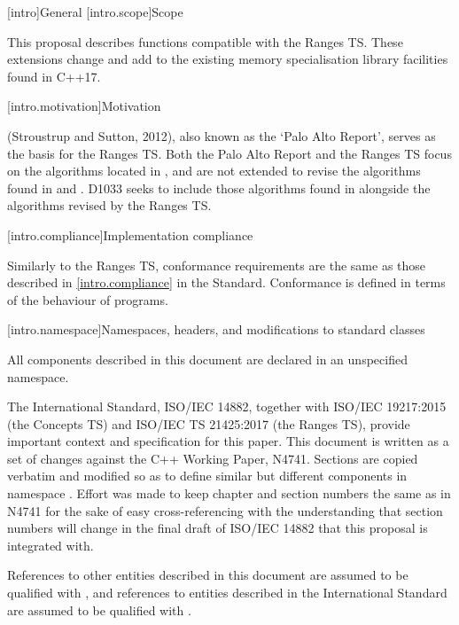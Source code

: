 [intro]{General}
[intro.scope]{Scope}

\pnum
This proposal describes functions compatible with the Ranges TS. These extensions change and add to
the existing memory specialisation library facilities found in C++17.

[intro.motivation]{Motivation}

\pnum
{} (Stroustrup and Sutton, 2012), also known as the
`Palo Alto Report', serves as the basis for the Ranges TS. Both the Palo Alto Report and the Ranges
TS focus on the algorithms located in , and are not extended to revise the
algorithms found in  and . D1033 seeks to include those algorithms
found in  alongside the algorithms revised by the Ranges TS.

[intro.compliance]{Implementation compliance}

\pnum
Similarly to the Ranges TS, conformance requirements are the same as those described in
\ref{intro.compliance} in the \Cpp Standard.
\enternote
Conformance is defined in terms of the behaviour of programs.
\exitnote

[intro.namespace]{Namespaces, headers, and modifications to standard classes}

\pnum
All components described in this document are declared in an unspecified namespace.


\pnum
The International Standard, ISO/IEC 14882, together with ISO/IEC 19217:2015 (the Concepts TS) and
ISO/IEC TS 21425:2017 (the Ranges TS), provide important context and specification for this paper.
This document is written as a set of changes against the C++ Working Paper, N4741. Sections are
copied verbatim and modified so as to define similar but different components in namespace .
Effort was made to keep chapter and section numbers the same as in N4741 for the sake of easy
cross-referencing with the understanding that section numbers will change in the final draft of
ISO/IEC 14882 that this proposal is integrated with.

\pnum
References to other entities described in this document are assumed to be qualified with
, and references to entities described in the International Standard are
assumed to be qualified with .

